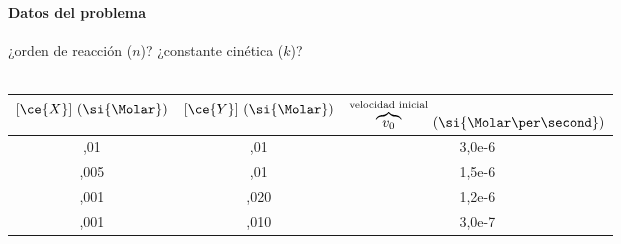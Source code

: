 
\begin{frame}
	\frametitle{\ejerciciocmd}
	\framesubtitle{Datos del problema}
	\begin{center}
		{\huge¿orden de reacción ($n$)? ¿constante cinética ($k$)?}\\[.3cm]
		\\[.3cm]
		\begin{tabular}{SSS}
			\toprule
				{$[\ce{X}]~(\si{\Molar})$} & {$[\ce{Y}]~(\si{\Molar})$} & {$\overbrace{v_0}^{\text{velocidad inicial}}~(\si{\Molar\per\second})$} \\
			\midrule
				,01  & ,01  & 3,0e-6 \\
				,005 & ,01  & 1,5e-6 \\
				,001 & ,020 & 1,2e-6 \\
				,001 & ,010 & 3,0e-7 \\
			\bottomrule
		\end{tabular}
	\end{center}
\end{frame}

